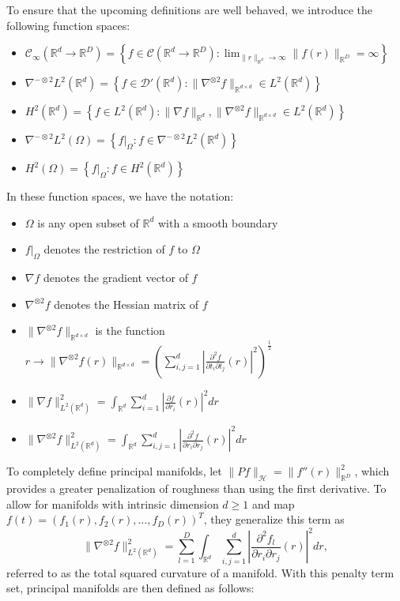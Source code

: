 \documentclass[11pt,reqno]{article}
\theoremstyle{definition}
\begin{document}
{To ensure that the upcoming definitions are well behaved, we introduce the following function spaces:
\begin{itemize}
  \item $\mathcal{C}_{\infty}(\mathbb{R}^{d} \to \mathbb{R}^{D}) = \left\{f \in \mathcal{C}(\mathbb{R}^{d} \to \mathbb{R}^{D}): \lim_{\|r\|_{\mathbb{R}^{d}} \to \infty}\|f(r)\|_{\mathbb{R}^{D}} = \infty\right\}$
  \item $\nabla^{-\otimes 2}L^2(\mathbb{R}^{d}) = \left\{f \in \mathcal{D}'(\mathbb{R}^{d}): \|\nabla^{\otimes 2}f\|_{\mathbb{R}^{d \times d}} \in L^2(\mathbb{R}^{d})\right\}$
  \item $H^2(\mathbb{R}^{d}) = \left\{f \in L^2(\mathbb{R}^{d}): \|\nabla f\|_{\mathbb{R}^{d}}, \|\nabla^{\otimes 2}f\|_{\mathbb{R}^{d \times d}} \in L^2(\mathbb{R}^{d})\right\}$
  \item $\nabla^{-\otimes 2}L^2(\Omega) = \left\{f|_{\Omega}: f \in \nabla^{-\otimes 2}L^2(\mathbb{R}^{d})\right\}$
  \item $H^2(\Omega) = \left\{f|_{\Omega}: f \in H^2(\mathbb{R}^{d})\right\}$
\end{itemize}

In these function spaces, we have the notation:
\begin{itemize}
  \item $\Omega$ is any open subset of $\mathbb{R}^{d}$ with a smooth boundary
  \item $f|_{\Omega}$ denotes the restriction of $f$ to $\Omega$
  \item $\nabla f$ denotes the gradient vector of $f$
  \item $\nabla^{\otimes 2}f$ denotes the Hessian matrix of $f$
  \item $\|\nabla^{\otimes 2}f\|_{\mathbb{R}^{d \times d}}$ is the function $r \to \|\nabla^{\otimes 2}f(r)\|_{\mathbb{R}^{d \times d}} = \left(\sum_{i, j = 1}^{d}\left|\frac{\partial^2f}{\partial t_i \partial t_j}(r)\right|^2\right)^{\frac{1}{2}}$
  \item $\|\nabla f\|_{L^2(\mathbb{R}^{d})}^2 = \int_{\mathbb{R}^{d}}\sum_{i=1}^{d}\left|\frac{\partial f}{\partial r_i}(r)\right|^2dr $
  \item $\|\nabla^{\otimes 2}f\|_{L^2(\mathbb{R}^{d})}^2 = \int_{\mathbb{R}^{d}}\sum_{i, j = 1}^{d}\left|\frac{\partial^2f}{\partial r_i \partial r_j}(r)\right|^2dr $
\end{itemize}

To completely define principal manifolds, \cite{mengPrincipalManifoldEstimation2021} let $\|Pf\|_{\mathcal{H}} = \|f''(r)\|_{\mathbb{R}^{D}}^2$, which provides a greater penalization of roughness than using the first derivative. To allow for manifolds with intrinsic dimension $d \geq 1$ and map $f(t) = \left(f_1(r), f_2(r), \dots, f_D(r)\right)^{T}$, they generalize this term as
\begin{equation}
  \|\nabla^{\otimes 2}f\|_{L^2(\mathbb{R}^{d})}^2 = \sum_{l=1}^{D} \int_{\mathbb{R}^{d}}\sum_{i, j = 1}^{d}\left|\frac{\partial^2f_l}{\partial r_i \partial r_j}(r)\right|^2dr, \label{eq:4}
\end{equation}
referred to as the total squared curvature of a manifold. With this penalty term set, principal manifolds are then defined as follows:}
\end{document}
